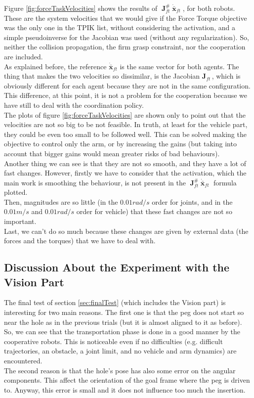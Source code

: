 Figure \ref{fig:forceTaskVelocities} shows the results of $\; \boldsymbol{J}^{\#}_{ft} \; \dot{\bar{\boldsymbol{x}}}_{ft}\;$, for both robots. These are the system velocities that we would give if the Force Torque objective was the only one in the TPIK list, without considering the activation, and a simple pseudoinverse for the Jacobian was used (without any regularization). So, neither the collision propagation, the firm grasp constraint, nor the cooperation are included.\\
As explained before, the reference $\dot{\bar{\boldsymbol{x}}}_{ft}$ is the same vector for both agents. The thing that makes the two velocities so dissimilar, is the Jacobian $\boldsymbol{J}_{ft}\,$, which is obviously different for each agent because they are not in the same configuration. This difference, at this point, it is not a problem for the cooperation because we have still to deal with the coordination policy.\\
 
The plots of figure \ref{fig:forceTaskVelocities} are shown only to point out that the velocities are not so big to be not feasible. In truth, at least for the vehicle part, they could be even too small to be followed well. This can be solved making the objective to control only the arm, or by increasing the gains (but taking into account that bigger gains would mean greater risks of bad behaviours).\\
Another thing we can see is that they are not so smooth, and they have a lot of fast changes. However, firstly we have to consider that the activation, which the main work is smoothing the behaviour, is not present in the $\; \boldsymbol{J}^{\#}_{ft} \; \dot{\bar{\boldsymbol{x}}}_{ft}\;$ formula plotted.\\
Then, magnitudes are so little (in the $0.01rad/s$ order for joints, and in the $0.01m/s$ and $0.01rad/s$ order for vehicle) that these fast changes are not so important.\\
Last, we can't do so much because these changes are given by external data (the forces and the torques) that we have to deal with.\\

\subsection{Discussion About the Experiment with the Vision Part}
The final test of section \ref{sec:finalTest} (which includes the Vision part) is interesting for two main reasons. The first one is that the peg does not start so near the hole as in the previous trials (but it is almost aligned to it as before). So, we can see that the transportation phase is done in a good manner by the cooperative robots. This is noticeable even if no difficulties (e.g. difficult trajectories, an obstacle, a joint limit, and no vehicle and arm dynamics) are encountered.\\
The second reason is that the hole's pose has also some error on the angular components. This affect the orientation of the goal frame where the peg is driven to. Anyway, this error is small and it does not influence too much the insertion. \\

